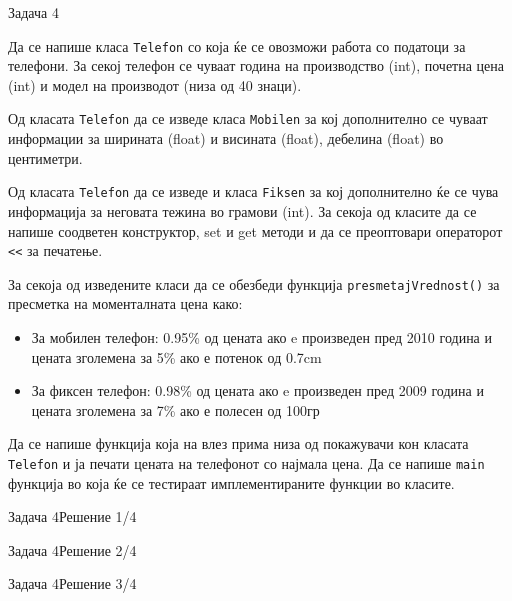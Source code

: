 \begin{frame}{Задача 4}
\begin{scriptsize}
    Да се напише класа \texttt{Telefon} со која ќе се овозможи работа со податоци за
    телефони. За секој телефон се чуваат година на производство (int), почетна
    цена (int) и модел на производот (низа од 40 знаци). 
    
    Од класата \texttt{Telefon} да се изведе класа \texttt{Mobilen} за кој дополнително се чуваат
    информации за ширината (float) и висината (float), дебелина (float) во центиметри. 
    
    Од класата \texttt{Telefon} да се изведе и класа \texttt{Fiksen} за кој дополнително ќе се
    чува информација за неговата тежина во грамови (int). За секоја од класите да се
    напише соодветен конструктор, set и get методи и да се преоптовари
    операторот \texttt{<<} за печатење. 
    
    За секоја од изведените класи да се обезбеди функција \texttt{presmetajVrednost()} за
    пресметка на моменталната цена како: 
    \begin{itemize}
      \item За мобилен телефон: 0.95\% од цената ако e произведен пред 2010
      година и цената зголемена за 5\% ако е потенок од 0.7cm
     \item За фиксен телефон: 0.98\% од цената ако e произведен пред 2009
     година и цената зголемена за 7\% ако е полесен од 100гр
    \end{itemize}
     
    Да се напише функција која на влез прима низа од покажувачи кон класата
    \texttt{Telefon} и ја печати цената на телефонот со најмала цена. Да се напише \texttt{main}
    функција во која ќе се тестираат имплементираните функции во класите.
\end{scriptsize}
\end{frame}

\begin{frame}[fragile]{Задача 4}{Решение 1/4}

\end{frame}

\begin{frame}[fragile]{Задача 4}{Решение 2/4}

\end{frame}

\begin{frame}[fragile]{Задача 4}{Решение 3/4}

\end{frame}

